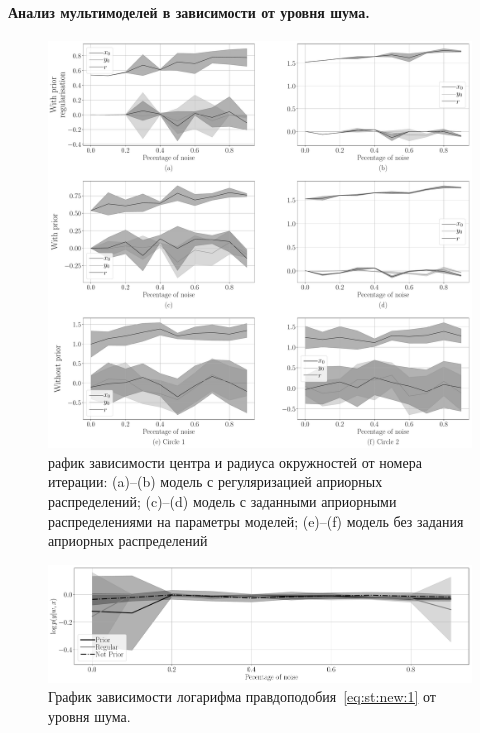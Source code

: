 \documentclass[12pt, twoside]{article}
\numberwithin{equation}{section}
\begin{document}
\paragraph{Анализ мультимоделей в зависимости от уровня шума.} 
\begin{figure}[h!t]\center
\includegraphics[width=1\textwidth]{result_eng/experiment_synthetic_param_progress_noise}
\caption{рафик зависимости центра и радиуса окружностей от номера итерации: (a)--(b) модель с регуляризацией априорных распределений; (c)--(d) модель с заданными априорными распределениями на параметры моделей; (e)--(f) модель без задания априорных распределений}
\label{experiment:st:3:1}
\end{figure}

\begin{figure}[h!t]\center
\includegraphics[width=1\textwidth]{result_eng/experiment_synt_likelihood_progress_noise}
\caption{График зависимости логарифма правдоподобия~\eqref{eq:st:new:1} от уровня шума.}
\label{experiment:st:3:2}
\end{figure}
\end{document}
